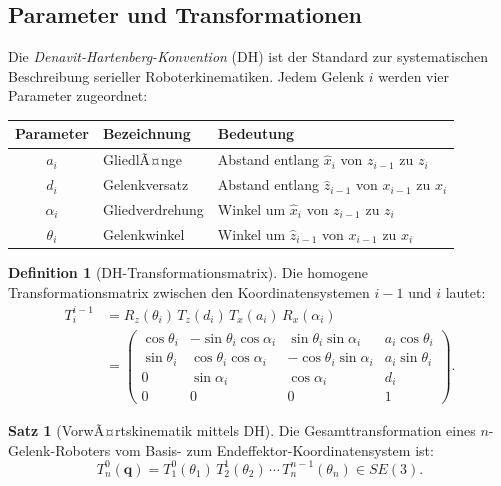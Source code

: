 ﻿\documentclass[a4paper,12pt]{article}
\theoremstyle{definition}
\newtheorem{definition}{Definition}
\newtheorem{satz}{Satz}
\begin{document}
\subsection{Parameter und Transformationen}

Die \emph{Denavit-Hartenberg-Konvention} (DH) ist der Standard zur systematischen Beschreibung serieller Roboterkinematiken. Jedem Gelenk $i$ werden vier Parameter zugeordnet:

\begin{center}
\begin{tabular}{cll}
	\toprule
	Parameter & Bezeichnung & Bedeutung \\
	\midrule
	$a_i$     & GliedlÃ¤nge  & Abstand entlang $\hat{x}_i$ von $z_{i-1}$ zu $z_i$ \\
	$d_i$     & Gelenkversatz & Abstand entlang $\hat{z}_{i-1}$ von $x_{i-1}$ zu $x_i$ \\
	$\alpha_i$ & Gliedverdrehung & Winkel um $\hat{x}_i$ von $z_{i-1}$ zu $z_i$ \\
	$\theta_i$ & Gelenkwinkel  & Winkel um $\hat{z}_{i-1}$ von $x_{i-1}$ zu $x_i$ \\
	\bottomrule
\end{tabular}
\end{center}

\begin{definition}[DH-Transformationsmatrix]
	Die homogene Transformationsmatrix zwischen den Koordinatensystemen $i-1$ und $i$ lautet:
	\begin{align*}
		T_i^{i-1} &= R_z(\theta_i)\, T_z(d_i)\, T_x(a_i)\, R_x(\alpha_i) \\
		&= \begin{pmatrix}
			\cos\theta_i & -\sin\theta_i \cos\alpha_i &  \sin\theta_i \sin\alpha_i & a_i\cos\theta_i \\
			\sin\theta_i &  \cos\theta_i \cos\alpha_i & -\cos\theta_i \sin\alpha_i & a_i\sin\theta_i \\
			0            &  \sin\alpha_i              &  \cos\alpha_i              & d_i             \\
			0            &  0                         &  0                         & 1
		\end{pmatrix}.
	\end{align*}
\end{definition}

\begin{satz}[VorwÃ¤rtskinematik mittels DH]
\label{satz:fk_dh}
	Die Gesamttransformation eines $n$-Gelenk-Roboters vom Basis- zum Endeffektor-Koordinatensystem ist:
	\[
		T_n^0(\mathbf{q}) = T_1^0(\theta_1)\, T_2^1(\theta_2)\, \cdots\, T_n^{n-1}(\theta_n) \in SE(3).
	\]
\end{satz}
\end{document}
